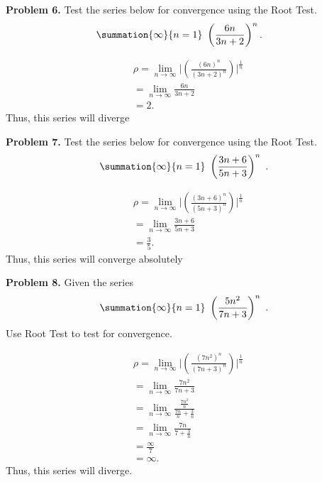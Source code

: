 \documentclass{report}
\begin{document}
   \bigbreak \noindent 
   \begin{mdframed}
       \textbf{Problem 6.} Test the series below for convergence using the Root Test.
       \begin{align*}
           &\summation{\infty}{n=1}\ \left(\frac{6n}{3n+2}\right)^{n}
       .\end{align*}
   \end{mdframed}
   \bigbreak \noindent 
   \begin{align*}
       &\rho  = \lim\limits_{n \to \infty}{\bigg\lvert \left(\frac{(6n)^{n}}{(3n+2)^{n}}\right) \bigg\rvert^{\frac{1}{n}}} \\
       &=\lim\limits_{n \to \infty}{\frac{6n}{3n+2}} \\
       &=2
   .\end{align*}
   \bigbreak \noindent 
   Thus, this series will diverge

   \bigbreak \noindent 
   \begin{mdframed}
       \textbf{Problem 7.} Test the series below for convergence using the Root Test.
       \begin{align*}
           \summation{\infty}{n=1}\ \left(\frac{3n+6}{5n+3}\right)^{n}\ 
       .\end{align*}
   \end{mdframed}
   \bigbreak \noindent 
   \begin{align*}
       &\rho = \lim\limits_{n \to \infty}{\bigg\lvert \left(\frac{(3n+6)^{n}}{(5n+3)^{n}}\right) \bigg\rvert^{\frac{1}{n}}} \\
       &=\lim\limits_{n \to \infty}{\frac{3n+6}{5n+3}} \\
       &=\frac{3}{5}
   .\end{align*}
   \bigbreak \noindent 
   Thus, this series will converge absolutely

   \pagebreak \bigbreak \noindent 
   \begin{mdframed}
       \textbf{Problem 8.} Given the series
       \begin{align*}
           \summation{\infty}{n=1}\ \left(\frac{5n^{2}}{7n+3}\right)^{n}\ 
       .\end{align*}
       \bigbreak \noindent 
       Use Root Test to test for convergence.
   \end{mdframed}
   \bigbreak \noindent 
   \begin{align*}
       &\rho = \lim\limits_{n \to \infty}{\bigg\lvert \left(\frac{(7n^{2})^{n}}{(7n+3)^{n}}\right) \bigg\rvert^{\frac{1}{n}}} \\
       &=\lim\limits_{n \to \infty}{\frac{7n^{2}}{7n+3}} \\
       &=\lim\limits_{n \to \infty}{\frac{\frac{7n^{2}}{n}}{\frac{7n}{n} + \frac{3}{n}}} \\
       &=\lim\limits_{n \to \infty}{\frac{7n}{7+\frac{3}{n}}} \\
       &=\frac{\infty}{7}\\
       &=\infty
   .\end{align*}
   \bigbreak \noindent 
   Thus, this series will diverge.
\end{document}
